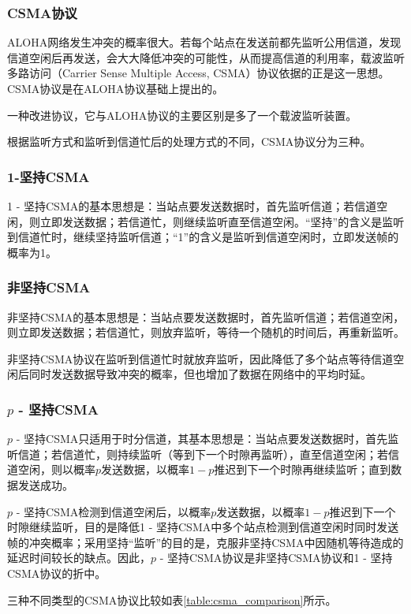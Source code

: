 \documentclass{ctexbook}
\begin{document}
	\subsubsection{CSMA协议}
	ALOHA网络发生冲突的概率很大。若每个站点在发送前都先监听公用信道，发现信道空闲后再发送，会大大降低冲突的可能性，从而提高信道的利用率，载波监听多路访问（Carrier Sense Multiple Access, CSMA）协议依据的正是这一思想。CSMA协议是在ALOHA协议基础上提出的。
	
	一种改进协议，它与ALOHA协议的主要区别是多了一个载波监听装置。
	
	根据监听方式和监听到信道忙后的处理方式的不同，CSMA协议分为三种。
	
	\subsubsection*{1-坚持CSMA}
	1 - 坚持CSMA的基本思想是：当站点要发送数据时，首先监听信道；若信道空闲，则立即发送数据；若信道忙，则继续监听直至信道空闲。“坚持”的含义是监听到信道忙时，继续坚持监听信道；“1”的含义是监听到信道空闲时，立即发送帧的概率为1。
	
	\subsubsection*{非坚持CSMA}
	非坚持CSMA的基本思想是：当站点要发送数据时，首先监听信道；若信道空闲，则立即发送数据；若信道忙，则放弃监听，等待一个随机的时间后，再重新监听。
	
	非坚持CSMA协议在监听到信道忙时就放弃监听，因此降低了多个站点等待信道空闲后同时发送数据导致冲突的概率，但也增加了数据在网络中的平均时延。
	
	\subsubsection*{$p$ - 坚持CSMA}
	$p$ - 坚持CSMA只适用于时分信道，其基本思想是：当站点要发送数据时，首先监听信道；若信道忙，则持续监听（等到下一个时隙再监听），直至信道空闲；若信道空闲，则以概率$p$发送数据，以概率$1 - p$推迟到下一个时隙再继续监听；直到数据发送成功。
	
	$p$ - 坚持CSMA检测到信道空闲后，以概率$p$发送数据，以概率$1 - p$推迟到下一个时隙继续监听，目的是降低1 - 坚持CSMA中多个站点检测到信道空闲时同时发送帧的冲突概率；采用坚持“监听”的目的是，克服非坚持CSMA中因随机等待造成的延迟时间较长的缺点。因此，$p$ - 坚持CSMA协议是非坚持CSMA协议和1 - 坚持CSMA协议的折中。
	
	三种不同类型的CSMA协议比较如表\ref{table:csma_comparison}所示。
	
\end{document}

